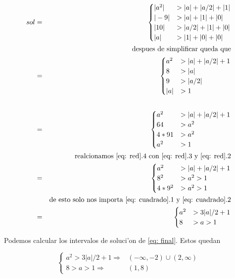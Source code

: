 \documentclass[11pt]{article}
\begin{document}
\begin{eqnarray}
    sol &=&
    \begin{cases}
        |a^2| &> |a| + |a/2| + |1| \\
        |-9|  &> |a| + |1| + |0| \\
        |10|  &> |a/2| + |1| + |0| \\
        |a|  &> |1| + |0| + |0| 
    \end{cases} \\
    && \text{despues de simplificar queda que} \\
    &=& \begin{cases}
        a^2 &> |a| + |a/2| + 1 \\
        8   &> |a| \\
        9  &> |a/2| \\
        |a| &> 1 
    \end{cases} \\
    && \\
    &=& \begin{cases}
        a^2 &> |a| + |a/2| + 1 \\
        64   &> a^2 \\
        4*91  &> a^2 \\
        a^2 &> 1 
    \end{cases} \label{eq: red}\\
    && \text{realcionamos \ref{eq: red}.4 con \ref{eq: red}.3 y \ref{eq: red}.2} \\
    &=& \begin{cases}
        a^2 &> |a| + |a/2| + 1 \\
        8^2   &> a^2 >  1\\
        4*9^2  &> a^2 > 1\\
    \end{cases} \label{eq: cuadrado}\\
    && \text{de esto solo nos importa \ref{eq: cuadrado}.1 y \ref{eq: cuadrado}.2} \\
    &=& \begin{cases}
        a^2 &> 3|a|/2 + 1 \\
        8   &> a >  1\\
    \end{cases} \label{eq: final}\\
\end{eqnarray}

Podemos calcular los intervalos de soluci'on de \ref{eq: final}. Estos
quedan

\begin{equation}
    \begin{cases}
        a^2 > 3|a|/2 + 1 \Rightarrow& (-\infty, -2) \cup(2, \infty)  \\
        8   > a >  1     \Rightarrow& (1, 8)
    \end{cases}
    \label{eq: casi sol}
\end{equation}
\end{document}
